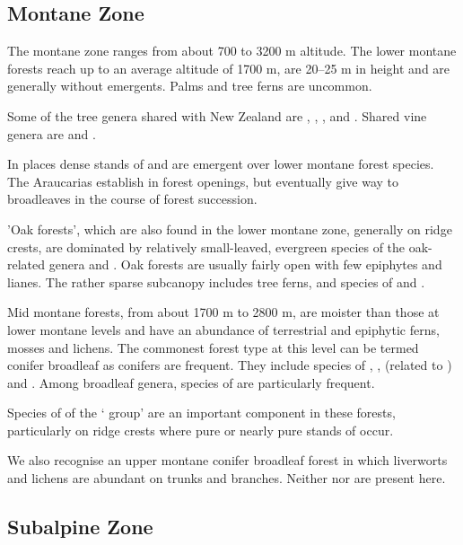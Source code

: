 \subsection{Montane Zone}

The montane zone ranges from about 700 to 3200 m altitude.
The lower montane forests reach up to an average altitude of 1700 m, are 20–25 m in height and are generally without emergents.
Palms and tree ferns are uncommon.

Some of the tree genera shared with New Zealand are , , ,  and .
Shared vine genera are  and .

In places dense stands of  and  are emergent over lower montane forest species.
The Araucarias establish in forest openings, but eventually give way to broadleaves in the course of forest succession.

'Oak forests', which are also found in the lower montane zone, generally on ridge crests, are dominated by relatively small-leaved, evergreen species of the oak-related genera  and .
Oak forests are usually fairly open with few epiphytes and lianes.
The rather sparse subcanopy includes tree ferns,  and species of  and .

Mid montane forests, from about 1700 m to 2800 m, are moister than those at lower montane levels and have an abundance of terrestrial and epiphytic ferns, mosses and lichens.
The commonest forest type at this level can be termed conifer broadleaf as conifers are frequent.
They include species of , ,  (related to ) and .
Among broadleaf genera, species of  are particularly frequent.

Species of  of the ` group' are an important component in these forests, particularly on ridge crests where pure or nearly pure stands of  occur.

We also recognise an upper montane conifer broadleaf forest in which liverworts and lichens are abundant on trunks and branches.
Neither  nor  are present here.

\subsection{Subalpine Zone}

